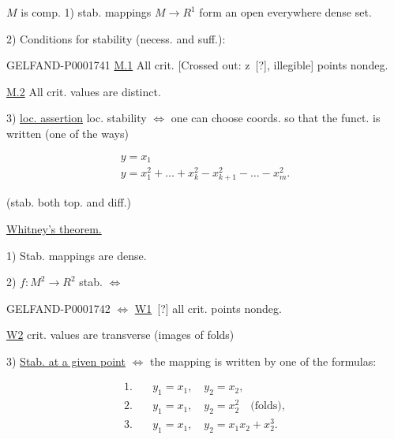  $M$ is comp. 1) stab. mappings $M\to R^1$ form an open
everywhere dense set.

2) Conditions for stability (necess. and suff.):



\begin{GelfandAdjacentEvidence}{GELFAND-P000174}{1}
\underline{M.1} All crit. [Crossed out: z\, [?], illegible] points nondeg.
\end{GelfandAdjacentEvidence}

\underline{M.2} All crit. values are distinct.


3) \underline{loc. assertion} loc. stability $\Longleftrightarrow$ one can choose
coords. so that the funct. is written (one of the ways)

\begin{gather*}
y=x_1\\
y=x_1^2+\ldots+x_k^2-x_{k+1}^2-\ldots-x_m^2.
\end{gather*}

(stab. both top. and diff.)


\underline{Whitney's theorem.}

1) Stab. mappings are dense.

2) $f: M^2\to R^2$ stab. $\Longleftrightarrow$

\begin{GelfandAdjacentEvidence}{GELFAND-P000174}{2}
$\Longleftrightarrow$ \underline{W1}\, [?] all crit. points nondeg.
\end{GelfandAdjacentEvidence}

\underline{W2} crit. values are transverse (images of folds)


3) \underline{Stab. at a given point} $\Longleftrightarrow$ the mapping is written by one of the formulas:

\begin{align*}
1.\quad&y_1=x_1,\quad y_2=x_2,\\
2.\quad&y_1=x_1,\quad y_2=x_2^2\quad\text{(folds)},\\
3.\quad&y_1=x_1,\quad y_2=x_1x_2+x_2^3.
\end{align*}


